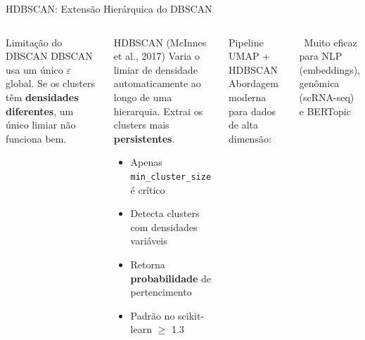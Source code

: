 \documentclass[aspectratio=169]{beamer}
\begin{document}
\begin{frame}{HDBSCAN: Extensão Hierárquica do DBSCAN}
    \vspace{-0.68cm}
    \begin{columns}
        \begin{block}{Limitação do DBSCAN}
            \footnotesize
            DBSCAN usa um único $\varepsilon$ global. Se os clusters têm \textbf{densidades diferentes}, um único limiar não funciona bem.
        \end{block}
        \begin{block}{HDBSCAN (McInnes et al., 2017)}
            \footnotesize
            Varia o limiar de densidade automaticamente ao longo de uma hierarquia. Extrai os clusters mais \textbf{persistentes}.
            \begin{itemize}\footnotesize
                \item Apenas \texttt{min\_cluster\_size} é crítico
                \item Detecta clusters com densidades variáveis
                \item Retorna \textbf{probabilidade} de pertencimento
                \item Padrão no scikit-learn $\geq$ 1.3
            \end{itemize}
        \end{block}
        \begin{block}{Pipeline UMAP + HDBSCAN}
            \footnotesize
            Abordagem moderna para dados de alta dimensão:
            \begin{center}
            \end{center}
        \end{block}
        \centering\tiny \faArrowRight\ Muito eficaz para NLP (embeddings), genômica (scRNA-seq) e BERTopic
    \end{columns}
\end{frame}
\end{document}
